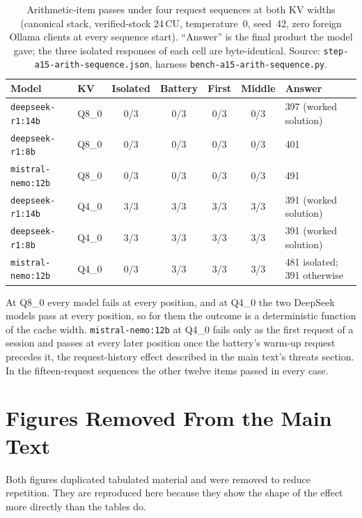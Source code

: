 \documentclass[11pt,a4paper]{article}
\begin{document}
\begin{table}[!ht]
\centering\footnotesize
\caption{Arithmetic-item passes under four request sequences at both KV
widths (canonical stack, verified-stock 24\,CU, temperature~0, seed~42,
zero foreign Ollama clients at every sequence start).  ``Answer'' is the
final product the model gave; the three isolated responses of each cell
are byte-identical.  Source: \texttt{step-a15-arith-sequence.json},
harness \texttt{bench-a15-arith-sequence.py}.}
\label{tab:s-arith}
\begin{tabular}{@{}llccccl@{}}
\toprule
\textbf{Model} & \textbf{KV} & \textbf{Isolated} & \textbf{Battery} & \textbf{First} & \textbf{Middle} & \textbf{Answer} \\
\midrule
\texttt{deepseek-r1:14b}  & Q8\_0 & 0/3 & 0/3 & 0/3 & 0/3 & 397 (worked solution) \\
\texttt{deepseek-r1:8b}   & Q8\_0 & 0/3 & 0/3 & 0/3 & 0/3 & 401 \\
\texttt{mistral-nemo:12b} & Q8\_0 & 0/3 & 0/3 & 0/3 & 0/3 & 491 \\
\midrule
\texttt{deepseek-r1:14b}  & Q4\_0 & 3/3 & 3/3 & 3/3 & 3/3 & 391 (worked solution) \\
\texttt{deepseek-r1:8b}   & Q4\_0 & 3/3 & 3/3 & 3/3 & 3/3 & 391 (worked solution) \\
\texttt{mistral-nemo:12b} & Q4\_0 & 0/3 & 3/3 & 3/3 & 3/3 & 481 isolated; 391 otherwise \\
\bottomrule
\end{tabular}
\end{table}

At Q8\_0 every model fails at every position, and at Q4\_0 the two
DeepSeek models pass at every position, so for them the outcome is a
deterministic function of the cache width.  \texttt{mistral-nemo:12b}
at Q4\_0 fails only as the first request of a session and passes at
every later position once the battery's warm-up request precedes it,
the request-history effect described in the main text's threats
section.  In the fifteen-request sequences the other twelve items
passed in every case.

\section{Figures Removed From the Main Text}

Both figures duplicated tabulated material and were removed to reduce
repetition.  They are reproduced here because they show the shape of
the effect more directly than the tables do.
\end{document}
